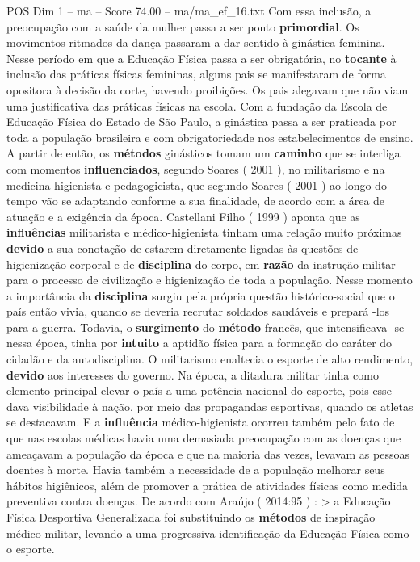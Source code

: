 \begin{textsample}{POS Dim 1 – ma – Score 74.00 – ma/ma\_ef\_16.txt}
Com essa inclusão, a preocupação com a saúde da mulher passa a ser ponto \textbf{primordial}.
Os movimentos ritmados da dança passaram a dar sentido à ginástica feminina.
Nesse período em que a Educação Física passa a ser obrigatória, no \textbf{tocante} à inclusão das práticas físicas femininas, alguns pais se manifestaram de forma opositora à decisão da corte, havendo proibições.
Os pais alegavam que não viam uma justificativa das práticas físicas na escola.
Com a fundação da Escola de Educação Física do Estado de São Paulo, a ginástica passa a ser praticada por toda a população brasileira e com obrigatoriedade nos estabelecimentos de ensino.
A partir de então, os \textbf{métodos} ginásticos tomam um \textbf{caminho} que se interliga com momentos \textbf{influenciados}, segundo Soares ( 2001 ), no militarismo e na medicina-higienista e pedagogicista, que segundo Soares ( 2001 ) ao longo do tempo vão se adaptando conforme a sua finalidade, de acordo com a área de atuação e a exigência da época.
Castellani Filho ( 1999 ) aponta que as \textbf{influências} militarista e médico-higienista tinham uma relação muito próximas \textbf{devido} a sua conotação de estarem diretamente ligadas às questões de higienização corporal e de \textbf{disciplina} do corpo, em \textbf{razão} da instrução militar para o processo de civilização e higienização de toda a população.
Nesse momento a importância da \textbf{disciplina} surgiu pela própria questão histórico-social que o país então vivia, quando se deveria recrutar soldados saudáveis e prepará -los para a guerra.
Todavia, o \textbf{surgimento} do \textbf{método} francês, que intensificava -se nessa época, tinha por \textbf{intuito} a aptidão física para a formação do caráter do cidadão e da autodisciplina.
O militarismo enaltecia o esporte de alto rendimento, \textbf{devido} aos interesses do governo.
Na época, a ditadura militar tinha como elemento principal elevar o país a uma potência nacional do esporte, pois esse dava visibilidade à nação, por meio das propagandas esportivas, quando os atletas se destacavam.
E a \textbf{influência} médico-higienista ocorreu também pelo fato de que nas escolas médicas havia uma demasiada preocupação com as doenças que ameaçavam a população da época e que na maioria das vezes, levavam as pessoas doentes à morte.
Havia também a necessidade de a população melhorar seus hábitos higiênicos, além de promover a prática de atividades físicas como medida preventiva contra doenças.
De acordo com Araújo ( 2014:95 ) : > a Educação Física Desportiva Generalizada foi substituindo os \textbf{métodos} de inspiração médico-militar, levando a uma progressiva identificação da Educação Física como o esporte.

\end{textsample}
